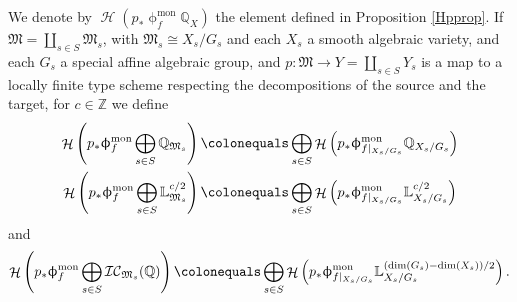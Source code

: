 \documentclass[a4paper,10pt]{amsart}
\renewcommand{\phi}{\upphi}
\newcommand{\LL}{\mathbb{L}}
\newcommand{\ZZ}{\mathbb{Z}}
\newcommand{\Mst}{\mathfrak{M}}
\newcommand{\ICS}{\mathcal{IC}}
\newcommand{\phim}[1]{\phi^{\mon}_{#1}}
\DeclareMathOperator{\mon}{mon}
\DeclareMathOperator{\Ho}{\mathcal{H}}
\begin{document}
We denote by $\Ho\left(p_*\phim{f}\mathbb{Q}_X\right)$ the element defined in Proposition \ref{Hpprop}.
\smallbreak
If $\Mst=\coprod_{s\in S} \Mst_s$, with $\Mst_s\cong X_s/G_s$ and each $X_s$ a smooth algebraic variety, and each $G_s$ a special affine algebraic group, and $p\colon \Mst\rightarrow Y=\coprod_{s\in S} Y_s$ is a map to a locally finite type scheme respecting the decompositions of the source and the target, for $c\in\ZZ$ we define 
\begin{align*}
\Ho\left(p_*\phim{f}\bigoplus_{s\in S}\mathbb{Q}_{\Mst_s}\right)\colonequals &\bigoplus_{s\in S} \Ho\left(p_*\phim{f|_{X_s/G_s}}\mathbb{Q}_{X_s/G_s}\right)\\
\Ho\left(p_*\phim{f}\bigoplus_{s\in S}\LL^{c/2}_{\Mst_s}\right)\colonequals &\bigoplus_{s\in S} \Ho\left(p_*\phim{f|_{X_s/G_s}}\LL^{c/2}_{X_s/G_s}\right)
\end{align*}
and
\[
\Ho\left(p_*\phim{f}\bigoplus_{s\in S}\ICS_{\Mst_s}(\mathbb{Q})\right)\colonequals \bigoplus_{s\in S}\Ho\left(p_*\phim{f|_{X_s/G_s}}\mathbb{L}^{(\dim(G_s)-\dim(X_s))/2}_{X_s/G_s}\right).
\]
\end{document}
